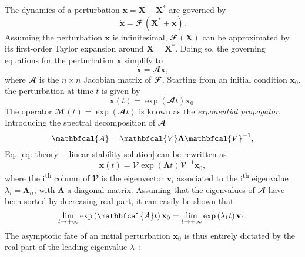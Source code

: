   The dynamics of a perturbation $\mathbf{x} = \mathbf{X} - \mathbf{X}^*$ are governed by
  \begin{equation}
    \dot{\mathbf{x}} = \mathbfcal{F}(\mathbf{X}^* + \mathbf{x}).
  \end{equation}
  Assuming the perturbation $\mathbf{x}$ is infinitesimal, $\mathbfcal{F}(\mathbf{X})$ can be approximated by its first-order Taylor expansion around $\mathbf{X} = \mathbf{X}^*$. Doing so, the governing equations for the perturbation $\mathbf{x}$ simplify to
  \begin{equation}
    \dot{\mathbf{x}} = \mathbfcal{A}\mathbf{x},
    \label{eq: theory -- linear perturbation dynamics}
  \end{equation}
  where $\mathbfcal{A}$ is the $n \times n$ Jacobian matrix of $\mathbfcal{F}$. Starting from an initial condition $\mathbf{x}_0$, the perturbation at time $t$ is given by
  \begin{equation}
    \mathbf{x}(t) = \exp \left( \mathbfcal{A}t \right) \mathbf{x}_0.
    \label{eq: theory -- linear stability solution}
  \end{equation}
  The operator $\mathbfcal{M}(t) = \exp \left( \mathbfcal{A}t \right)$ is known as the \emph{exponential propagator}. Introducing the spectral decomposition of $\mathbfcal{A}$
  \begin{equation}
    \mathbfcal{A} = \mathbfcal{V} \boldsymbol{\Lambda} \mathbfcal{V}^{-1},
    \notag
  \end{equation}
  Eq. \eqref{eq: theory -- linear stability solution} can be rewritten as
  \begin{equation}
    \mathbf{x}(t) = \mathbfcal{V} \exp \left( \boldsymbol{\Lambda} t \right) \mathbfcal{V}^{-1} \mathbf{x}_0,
  \end{equation}
  where the i\textsuperscript{th} column of $\mathbfcal{V}$ is the eigenvector $\mathbf{v}_i$ associated to the i\textsuperscript{th} eigenvalue $\lambda_i = \boldsymbol{\Lambda}_{ii}$, with $\boldsymbol{\Lambda}$ a diagonal matrix. Assuming that the eigenvalues of $\mathbfcal{A}$ have been sorted by decreasing real part, it can easily be shown that
  \begin{equation}
    \lim\limits_{t \to + \infty} \exp \left( \mathbfcal{A} t \right) \mathbf{x}_0 = \lim \limits_{t \to + \infty} \exp \left( \lambda_1 t \right) \mathbf{v}_1 .
    \notag
  \end{equation}
  The asymptotic fate of an initial perturbation $\mathbf{x}_0$ is thus entirely dictated by the real part of the leading eigenvalue $\lambda_1$:
